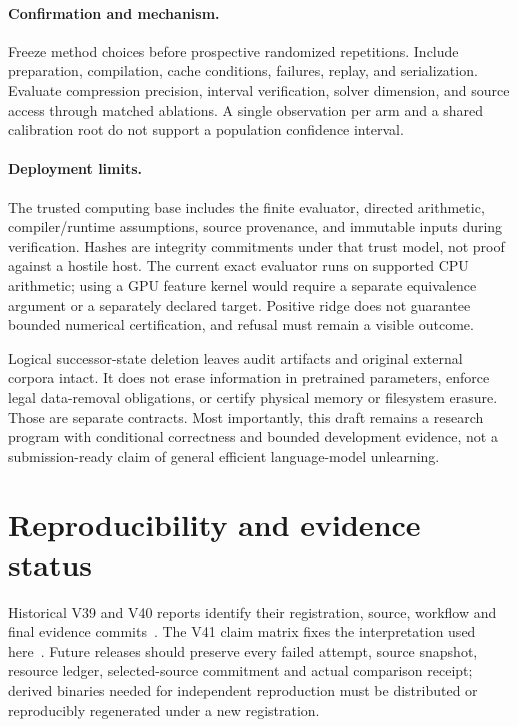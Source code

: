 \documentclass[10pt,twocolumn,letterpaper]{article}
\begin{document}
\paragraph{Confirmation and mechanism.}
Freeze method choices before prospective randomized repetitions. Include
preparation, compilation, cache conditions, failures, replay, and serialization.
Evaluate compression precision, interval verification, solver dimension, and
source access through matched ablations. A single observation per arm and a
shared calibration root do not support a population confidence interval.

\paragraph{Deployment limits.}
The trusted computing base includes the finite evaluator, directed arithmetic,
compiler/runtime assumptions, source provenance, and immutable inputs during
verification. Hashes are integrity commitments under that trust model, not proof
against a hostile host. The current exact evaluator runs on supported CPU
arithmetic; using a GPU feature kernel would require a separate equivalence
argument or a separately declared target. Positive ridge does not guarantee
bounded numerical certification, and refusal must remain a visible outcome.

Logical successor-state deletion leaves audit artifacts and original external
corpora intact. It does not erase information in pretrained parameters, enforce
legal data-removal obligations, or certify physical memory or filesystem erasure.
Those are separate contracts. Most importantly, this draft remains a research
program with conditional correctness and bounded development evidence, not a
submission-ready claim of general efficient language-model unlearning.

\section{Reproducibility and evidence status}
Historical V39 and V40 reports identify their registration, source, workflow and
final evidence commits~\cite{v39,v40}. The V41 claim matrix fixes the interpretation
used here~\cite{boundaries}. Future releases should preserve every failed attempt,
source snapshot, resource ledger, selected-source commitment and actual comparison
receipt; derived binaries needed for independent reproduction must be distributed
or reproducibly regenerated under a new registration.
\end{document}
